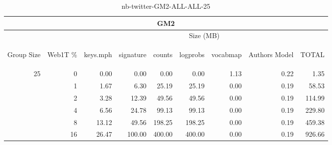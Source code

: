 \begin{center}
\begin{table}[htbp]
\begin{tabular}{ | r | r | r | r | r | r | r | r | r |}
\hline
\multicolumn{9}{|c|}{GM2}\\
\hline
 & & \multicolumn{7}{|c|}{Size (MB)}\\ \cline{3-9}
\begin{sideways}Group Size\end{sideways} & \begin{sideways}Web1T \% \end{sideways} & \begin{sideways}keys.mph\end{sideways} & \begin{sideways}signature\end{sideways} & \begin{sideways}counts\end{sideways} & \begin{sideways}logprobs\end{sideways} & \begin{sideways}vocabmap\end{sideways} & \begin{sideways}Authors Model \end{sideways} & \begin{sideways}TOTAL\end{sideways}\\
\hline
\multirow{5}{*}{25}
 & 0 & 0.00 & 0.00 & 0.00 & 0.00 & 1.13 & 0.22 & 1.35\\ \cline{2-9}
 & 1 & 1.67 & 6.30 & 25.19 & 25.19 & 0.00 & 0.19 & 58.53\\ \cline{2-9}
 & 2 & 3.28 & 12.39 & 49.56 & 49.56 & 0.00 & 0.19 & 114.99\\ \cline{2-9}
 & 4 & 6.56 & 24.78 & 99.13 & 99.13 & 0.00 & 0.19 & 229.80\\ \cline{2-9}
 & 8 & 13.12 & 49.56 & 198.25 & 198.25 & 0.00 & 0.19 & 459.38\\ \cline{2-9}
 & 16 & 26.47 & 100.00 & 400.00 & 400.00 & 0.00 & 0.19 & 926.66\\ \cline{2-9}
\hline
\end{tabular}
\caption{nb-twitter-GM2-ALL-ALL-25}
\label{table:nb-twitter-GM2-ALL-ALL-25}
\end{table}
\end{center}

